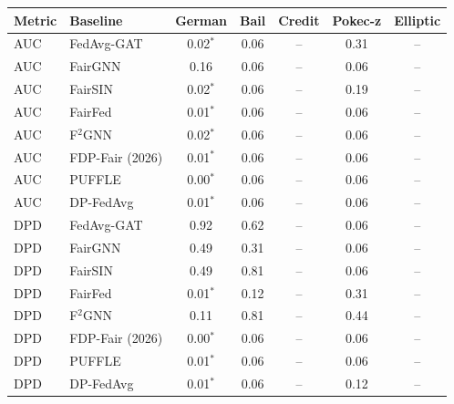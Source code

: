 \begin{tabular}{llccccc}
\toprule
Metric & Baseline & German & Bail & Credit & Pokec-z & Elliptic \\
\midrule
AUC & FedAvg-GAT & 0.02$^{*}$ & 0.06 & -- & 0.31 & -- \\
AUC & FairGNN & 0.16 & 0.06 & -- & 0.06 & -- \\
AUC & FairSIN & 0.02$^{*}$ & 0.06 & -- & 0.19 & -- \\
AUC & FairFed & 0.01$^{*}$ & 0.06 & -- & 0.06 & -- \\
AUC & F$^2$GNN & 0.02$^{*}$ & 0.06 & -- & 0.06 & -- \\
AUC & FDP-Fair (2026) & 0.01$^{*}$ & 0.06 & -- & 0.06 & -- \\
AUC & PUFFLE & 0.00$^{*}$ & 0.06 & -- & 0.06 & -- \\
AUC & DP-FedAvg & 0.01$^{*}$ & 0.06 & -- & 0.06 & -- \\
\midrule
DPD & FedAvg-GAT & 0.92 & 0.62 & -- & 0.06 & -- \\
DPD & FairGNN & 0.49 & 0.31 & -- & 0.06 & -- \\
DPD & FairSIN & 0.49 & 0.81 & -- & 0.06 & -- \\
DPD & FairFed & 0.01$^{*}$ & 0.12 & -- & 0.31 & -- \\
DPD & F$^2$GNN & 0.11 & 0.81 & -- & 0.44 & -- \\
DPD & FDP-Fair (2026) & 0.00$^{*}$ & 0.06 & -- & 0.06 & -- \\
DPD & PUFFLE & 0.01$^{*}$ & 0.06 & -- & 0.06 & -- \\
DPD & DP-FedAvg & 0.01$^{*}$ & 0.06 & -- & 0.12 & -- \\
\bottomrule
\end{tabular}